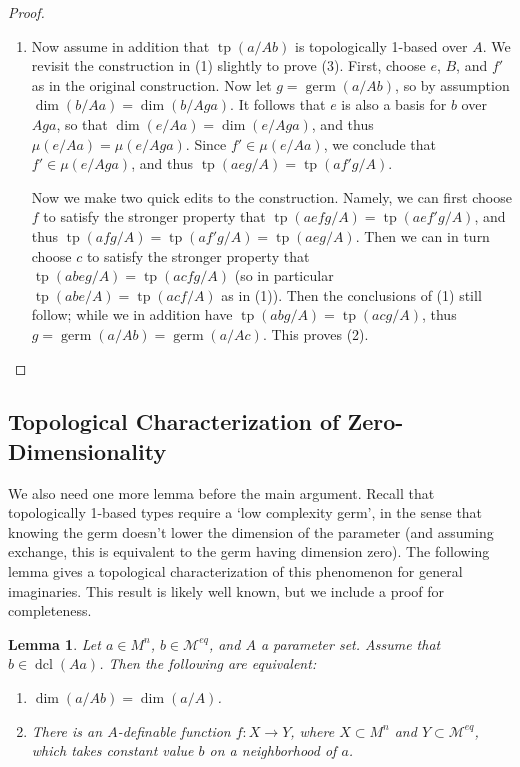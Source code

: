 \documentclass{amsart}
\newtheorem{lemma}[theorem]{Lemma}
\theoremstyle{definition}
\newcommand{\dcl}{\operatorname{dcl}}
\newcommand{\tp}{\operatorname{tp}}
\begin{document}
\begin{proof}
\begin{enumerate}
    On the other hand, we compute: $$\dim(abc/B)=\dim(abc/A)=\dim(ab/A)+\dim(c/Aab)$$ $$=\dim(ac/A)+\dim(b/Aa)\geq\dim(ac/B)+\dim(b/Bac)$$ $$\geq\dim(abc/B).$$ So all inequalities above must be equalities, and this implies $$\dim(b/Bac)=\dim(b/Aa)\geq\dim(b/Ba).$$ Thus $b$ is also independent from $c$ over $Ba$, which proves (2).
    
     \item

    Now assume in addition that $\tp(a/Ab)$ is topologically 1-based over $A$. We revisit the construction in (1) slightly to prove (3). First, choose $e$, $B$, and $f'$ as in the original construction. Now let $g=\operatorname{germ}(a/Ab)$, so by assumption $\dim(b/Aa)=\dim(b/Aga)$. It follows that $e$ is also a basis for $b$ over $Aga$, so that $\dim(e/Aa)=\dim(e/Aga)$, and thus $\mu(e/Aa)=\mu(e/Aga)$. Since $f'\in\mu(e/Aa)$, we conclude that $f'\in\mu(e/Aga)$, and thus $\tp(aeg/A)=\tp(af'g/A)$.
    
    Now we make two quick edits to the construction. Namely, we can first choose $f$ to satisfy the stronger property that $\tp(aefg/A)=\tp(aef'g/A)$, and thus $\tp(afg/A)=\tp(af'g/A)=\tp(aeg/A)$. Then we can in turn choose $c$ to satisfy the stronger property that $\tp(abeg/A)=\tp(acfg/A)$ (so in particular $\tp(abe/A)=\tp(acf/A)$ as in (1)). Then the conclusions of (1) still follow; while we in addition have $\tp(abg/A)=\tp(acg/A)$, thus $g=\operatorname{germ}(a/Ab)=\operatorname{germ}(a/Ac)$. This proves (2).
    \end{enumerate}
    \end{proof}

\subsection{Topological Characterization of Zero-Dimensionality}

We also need one more lemma before the main argument. Recall that topologically 1-based types require a `low complexity germ', in the sense that knowing the germ doesn't lower the dimension of the parameter (and assuming exchange, this is equivalent to the germ having dimension zero). The following lemma gives a topological characterization of this phenomenon for general imaginaries. This result is likely well known, but we include a proof for completeness.

\begin{lemma}\label{L: 0-dim}
    Let $a\in M^n$, $b\in\mathcal M^{eq}$, and $A$ a parameter set. Assume that $b\in\dcl(Aa)$. Then the following are equivalent:
    \begin{enumerate}
    \item $\dim(a/Ab)=\dim(a/A)$.
    \item There is an $A$-definable function $f:X\rightarrow Y$, where $X\subset M^n$ and $Y\subset\mathcal M^{eq}$, which takes constant value $b$ on a neighborhood of $a$.
    \end{enumerate}
\end{lemma}
\end{document}

